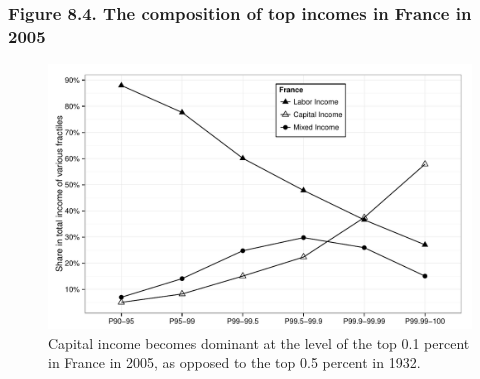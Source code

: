 \documentclass[t]{beamer}\usepackage[]{graphicx}\usepackage[]{color}
\newenvironment{knitrout}{}{} %
\begin{document}
\begin{frame}[label=Figure_8_4,fragile]
\frametitle{Figure 8.4. The composition of top incomes in France in 2005}
\begin{figure}[t]
\begin{minipage}[b]{\textwidth}
\centering
\begin{knitrout}\footnotesize
{}\color{fgcolor}

{\centering \includegraphics[width=1\linewidth]{figures/bw/Figure_8_4} 

}



\end{knitrout}
\caption{Capital income becomes dominant at the level of the top 0.1 percent in France in 2005, as opposed to the top 0.5 percent in 1932.}
\end{minipage}
\end{figure}
\end{frame}
\end{document}
